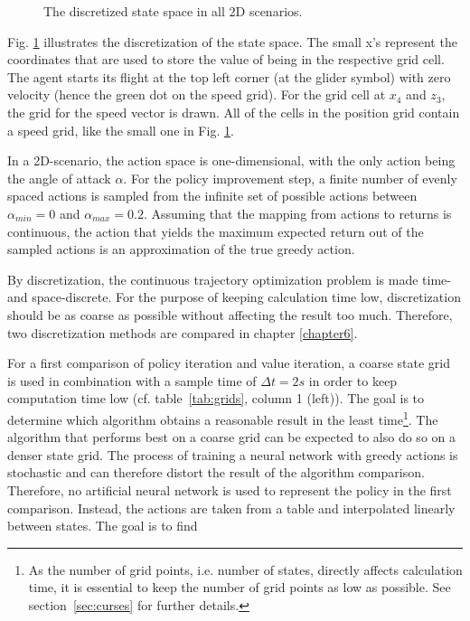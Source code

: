 \begin{figure}
	\caption{The discretized state space in all 2D scenarios. }
	\label{tikz:2d_state_space_discretized}
\end{figure}

Fig. \ref{tikz:2d_state_space_discretized} illustrates the discretization of the state space. The small x's represent the coordinates that are used to store the value of being in the respective grid cell. The agent starts its flight at the top left corner (at the glider symbol) with zero velocity (hence the green dot on the speed grid). For the grid cell at $x_4$ and $z_3$, the grid for the speed vector is drawn. All of the cells in the position grid contain a speed grid, like the small one in Fig. \ref{tikz:2d_state_space_discretized}.

In a 2D-scenario, the action space is one-dimensional, with the only action being the angle of attack $\alpha$. For the policy improvement step, a finite number of evenly spaced actions is sampled from the infinite set of possible actions between $\alpha_{min} = 0$ and $\alpha_{max}=0.2$. Assuming that the mapping from actions to returns is continuous, the action that yields the maximum expected return out of the sampled actions is an approximation of the true greedy action.

By discretization, the continuous trajectory optimization problem is made time- and space-discrete. For the purpose of keeping calculation time low, discretization should be as coarse as possible without affecting the result too much. Therefore, two discretization methods are compared in chapter \ref{chapter6}. 

For a first comparison of policy iteration and value iteration, a coarse state grid is used in combination with a sample time of $\Delta t = 2s$ in order to keep computation time low (cf. table~\ref{tab:grids}, column 1 (left)). The goal is to determine which algorithm obtains a reasonable result in the least time\footnote{As the number of grid points, i.e. number of states, directly affects calculation time, it is essential to keep the number of grid points as low as possible. See section~\ref{sec:curses} for further details.}. The algorithm that performs best on a coarse grid can be expected to also do so on a denser state grid.
The process of training a neural network with greedy actions is stochastic and can therefore distort the result of the algorithm comparison. Therefore, no artificial neural network is used to represent the policy in the first comparison. Instead, the actions are taken from a table and interpolated linearly between states. The goal is to find 

